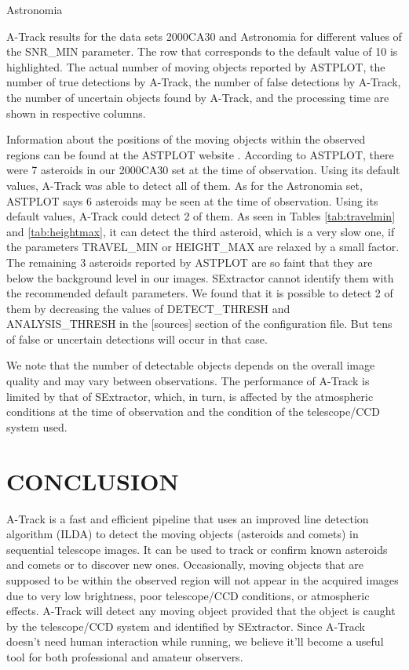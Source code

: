 \documentclass[review]{elsarticle}
\begin{document}
\begin{table}[H]
\begin{subtable}[h]{0.45\textwidth}
{        }
        \caption{Astronomia}
        \label{tab:astronomia_snr}
    \end{subtable}
    \caption{A-Track results for the data sets 2000CA30 and Astronomia for different values of the SNR\_MIN parameter. The row that corresponds to the default value of 10 is highlighted. The actual number of moving objects reported by ASTPLOT, the number of true detections by A-Track, the number of false detections by A-Track, the number of uncertain objects found by A-Track, and the processing time are shown in respective columns.}
    \label{tab:snr}
\end{table}

Information about the positions of the moving objects within the observed regions can be found at the ASTPLOT website \citep{astplot}. According to ASTPLOT, there were 7 asteroids in our 2000CA30 set at the time of observation. Using its default values, A-Track was able to detect all of them. As for the Astronomia set, ASTPLOT says 6 asteroids may be seen at the time of observation. Using its default values, A-Track could detect 2 of them. As seen in Tables \ref{tab:travelmin} and \ref{tab:heightmax}, it can detect the third asteroid, which is a very slow one, if the parameters TRAVEL\_MIN or HEIGHT\_MAX are relaxed by a small factor. The remaining 3 asteroids reported by ASTPLOT are so faint that they are below the background level in our images. SExtractor cannot identify them with the recommended default parameters. We found that it is possible to detect 2 of them by decreasing the values of DETECT\_THRESH and ANALYSIS\_THRESH in the [sources] section of the configuration file. But tens of false or uncertain detections will occur in that case.

We note that the number of detectable objects depends on the overall image quality and may vary between observations. The performance of A-Track is limited by that of SExtractor, which, in turn, is affected by the atmospheric conditions at the time of observation and the condition of the telescope/CCD system used.


\section{CONCLUSION}

A-Track is a fast and efficient pipeline that uses an improved line detection algorithm (ILDA) to detect the moving objects (asteroids and comets) in sequential telescope images. It can be used to track or confirm known asteroids and comets or to discover new ones. Occasionally, moving objects that are supposed to be within the observed region will not appear in the acquired images due to very low brightness, poor telescope/CCD conditions, or atmospheric effects. A-Track will detect any moving object provided that the object is caught by the telescope/CCD system and identified by SExtractor. Since A-Track doesn't need human interaction while running, we believe it'll become a useful tool for both professional and amateur observers.
\end{document}
